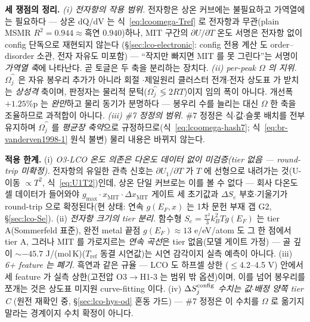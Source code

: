 \medskip
\textbf{세 쟁점의 정리.} \emph{(i) 전자항의 작용 범위.} 전자항은 상온 커브에는 불필요하고 가역열에는 필요하다 ---
상온 dQ/dV 는 식~\eqref{eq:lcoomega-Tref} 로 전자항과 무관(plain MSMR $R^2{=}0.944\!\approx\!$흑연
$0.940$)하나, MIT 구간의 $\partial U/\partial T$ 온도 서명은 전자항 없이 config 단독으로 재현되지 않는다
(\S\ref{sec:lco-electronic}: config 전용 계산\cite{ml2024} 도 order--disorder 소관, 전자 자유도 미포함) --- ``작지만
빠지면 MIT 를 못 그린다''는 서명이 \emph{가역열 축}에 나타난다. 곧 토글은 두 축을 분리하는 장치다.
\emph{(ii) per-peak $\Omega$ 의 지위.} $\Omega_j^\cat$ 은 자유 봉우리 추가가 아니라 회절
\cite{reimers1992}$\cdot$제일원리 클러스터 전개\cite{vanderven1998}$\cdot$전자 상도표\cite{motohashi2009} 가
받치는 \emph{상성격} 축이며, 판정자는 물리적 문턱($\Omega_j^\cat\!\lessgtr\!2RT$)이지 임의 폭이 아니다. 개선폭
$+1.25\%$p 는 \emph{완만}하고 물리 동기가 분명하다 --- 봉우리 수를 늘리는 대신 $\Omega$ 한 축을 조율하므로 과적합이 아니다.
\emph{(iii) \#7 정정의 범위.} \#7 정정은 식$\cdot$값$\cdot$슬롯 배치를 전부 유지하며 $\Omega_j^\cat$ 를
\emph{평균장 축약}으로 규정하므로(식~\eqref{eq:lcoomega-hash7}; 식~\eqref{eq:br-vanderven1998-1} 원식 불변) 물리
내용은 바뀌지 않는다.

\begin{warnbox}
\textbf{적용 한계.} (i) \emph{O3-LCO 온도 의존은 다온도 데이터 없이 미검증(tier 없음 --- round-trip 미확정).}
전자항의 유일한 관측 신호는 $\partial U_1/\partial T$ 가 $T$ 에 선형으로 내려가는 것(U-이동 $\propto T^2$,
식~\eqref{eq:U1T2})인데, 상온 단일 커브로는 이를 볼 수 없다 --- 회사 다온도 셀 데이터가 들어와야
$g_{\max}\cdot x_\mathrm{MIT}\cdot\Delta x_\mathrm{MIT}$ 게이트 세 초기값과 $\Delta S_e$ 부호$\cdot$기울기가
round-trip 으로 확정된다(현 상태: 연속 $g(E_F,x)$ 는 1차 문헌 부재 갭 G2, \S\ref{sec:lco-Se}). (ii) \emph{전자항
크기의 tier 분리.} 함수형 $S_e{=}\tfrac{\pi^2}{3}k_B^2Tg(E_F)$ 는 tier A(Sommerfeld 표준), 완전 metal 끝점
$g(E_F)\!\approx\!13$ e/eV/atom 도 그 한 점에서 tier A\cite{motohashi2009}, 그러나 MIT 를 가로지르는 \emph{연속
곡선}은 tier 없음(모델 게이트 가정) --- 골 깊이 $\sim-45.7$ J/(mol\,K)($T_\mathrm{ref}$ 동결 시연값)는 시연
감각이지 실측 예측이 아니다. (iii) \emph{6+ feature 는 폐기.} 흑연과 같은 규율 --- LCO 도 하프셀 상한
($\le$4.2--4.5 V) 안에서 세 feature 가 실측 상한(고전압 O3$\to$H1-3 는 범위 밖 옵션)이며, 이를 넘어 봉우리를
쪼개는 것은 상도표 미지원 curve-fitting 이다. (iv) \emph{$\Delta S_j^{\mathrm{config}}$ 수치는 값$\cdot$배정 양쪽 tier C}
(원전 재확인 중, \S\ref{sec:lco-hys-od} 혼동 가드) --- \#7 정정은 이 수치를 $\Omega$ 로 옮기지 말라는 경계이지
수치 확정이 아니다.
\end{warnbox}

